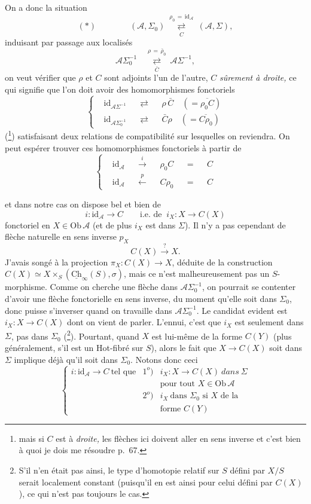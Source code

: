 \documentclass[11pt]{article}
\newcommand{\printedpage}[1]{\marginpar{\footnotesize p.~#1}}
\newcommand{\msp}[1]{\marginpar{\footnotesize [#1]}}
\newcommand{\Ob}{\mathrm{Ob}}
\newcommand{\id}{\mathrm{id}}
\newcommand{\cA}{\mathcal{A}}
\newcommand{\ul}[1]{\underline{\mathrm{#1}}}
\begin{document}
On a donc la situation
\printedpage{40}
\[
(*)\qquad\qquad(\cA,\Sigma_0)\ \underset{C}{\overset{\rho_0\,=\,\id_{\cA}}{\rightleftarrows}}\ (\cA,\Sigma),
\]
induisant par passage aux localisés
\[
\cA\Sigma_0^{-1}\quad\underset{\bar{C}}{\overset{\rho\,=\,\bar{\rho}_0}{\rightleftarrows}}\ \cA\Sigma^{-1},
\]
on veut vérifier que $\rho$ et $C$ sont adjoints l'un de l'autre, $C$ \textit{sûrement à droite,} ce qui signifie que l'on doit avoir des homomorphismes fonctoriels
\[
\left\{
\begin{aligned}
&\id_{\cA\Sigma^{-1}}&&\rightleftarrows&&\rho\,\bar{C}\quad(=\overline{\rho_0C})\\
&\id_{\cA\Sigma_0^{-1}}&&\rightleftarrows&&\bar{C}\rho\quad(=\overline{C\rho_0})
\end{aligned}
\right.
\]
(\footnote[41]{mais si $C$ est à \textit{droite,} les flèches ici doivent aller en sens inverse et c'est bien à quoi je dois me résoudre p.~67.}) satisfaisant deux relations de compatibilité sur lesquelles on reviendra. On peut espérer trouver ces homomorphismes fonctoriels à partir de
\[
\left\{
\begin{aligned}
&\id_{\cA}&&\xrightarrow{\ i\ }&&\rho_0C&&=&&C\\
&\id_{\cA}&&\xleftarrow{\ p\ }&&C\rho_0&&=&&C
\end{aligned}
\right.
\]

\msp{page 66}
et dans notre cas on dispose bel et bien de
\[
i:\id_{\cA}\longrightarrow C\qquad\text{i.e. de }\ i_X:X\longrightarrow C(X)
\]
fonctoriel en $X\in\Ob\,\cA$ (et de plus $i_X$ est dans $\Sigma$). Il n'y a pas cependant de flèche naturelle en sens inverse $p_X$
\[
C(X)\xrightarrow{\ ?\ }X.
\]
J'avais songé à la projection $\pi_X:C(X)\longrightarrow X$, déduite de la construction $C(X)\simeq X\times_S(\ul{Ch}_\infty(S),\sigma)$, mais ce n'est malheureusement pas un $S$-morphisme. Comme on cherche une flèche dans $\cA\Sigma_0^{-1}$, on pourrait se contenter d'avoir une flèche fonctorielle en sens inverse, du moment qu'elle soit dans $\Sigma_0$, donc puisse s'inverser quand on travaille dans $\cA\Sigma_0^{-1}$. Le candidat evident est $i_X:X\longrightarrow C(X)$ dont on vient de parler. L'ennui, c'est que $i_X$ est seulement dans $\Sigma$, pas dans $\Sigma_0$ (\footnote[42]{S'il n'en était pas ainsi, le type d'homotopie relatif sur $S$ défini par $X/S$ serait localement constant (puisqu'il en est ainsi pour celui défini par $C(X)$), ce qui n'est pas toujours le cas.}). Pourtant, quand $X$ est lui-même de la forme $C(Y)$ (plus généralement, s'il est un Hot-fibré sur $S$), alors le fait que $X\longrightarrow C(X)$ soit dans $\Sigma$ implique déjà qu'il soit dans $\Sigma_0$. Notons donc ceci %
\[
\left\{
\begin{array}{lrl}
i:\id_{\cA}\longrightarrow C\ \text{tel que} & 1^o) & i_X:X\longrightarrow C(X)\ \textit{dans}\ \Sigma\\[1ex]
 & & \text{pour tout }X\in\Ob\,\cA\\[1ex]
 & 2^o) & i_X\ \text{dans }\Sigma_0\text{ si }X\text{ de la}\\[1ex]
 & & \text{forme }C(Y)
\end{array}
\right.
\]
\end{document}
